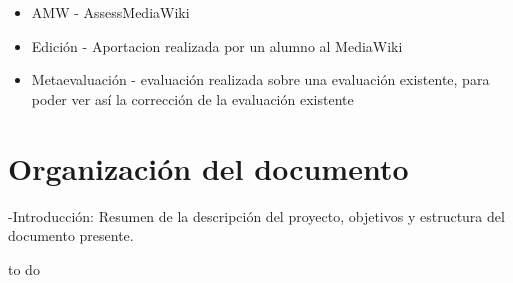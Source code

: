 \begin{itemize}
	\item AMW - AssessMediaWiki
	\item Edición - Aportacion realizada por un alumno al MediaWiki
	\item Metaevaluación - evaluación realizada sobre una evaluación existente, para poder ver así la corrección de la evaluación existente
\end{itemize}

\section{Organización del documento}

-Introducción: Resumen de la descripción del proyecto, objetivos y estructura del documento presente.

to do




